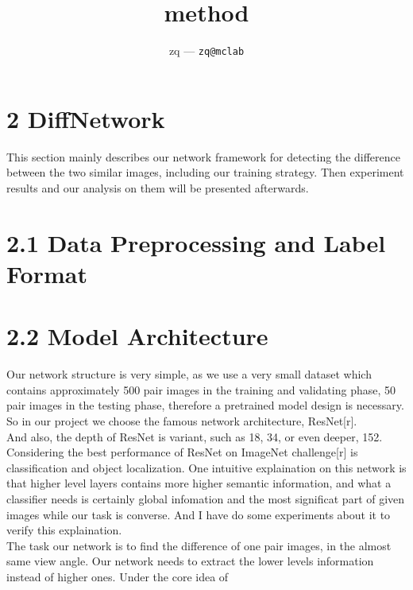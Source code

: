 \documentclass[12pt]{article}
\title{
	method
}
\author{
	zq --- \texttt{zq@mclab}
}
\begin{document}
\maketitle

\section{2 DiffNetwork}

This section mainly describes our network framework for detecting the difference between the two similar images, including our training strategy. Then experiment results and our analysis on them will be presented afterwards.\\

\section{2.1 Data Preprocessing and Label Format}


\section{2.2 Model Architecture}

Our network structure is very simple, as we use a very small dataset which contains approximately 500 pair images in the training and validating phase,  50 pair images in the testing phase, therefore a pretrained model design is necessary. So in our project we choose the famous network architecture, ResNet[r].\\

And also, the depth of ResNet is variant, such as 18, 34, or even deeper, 152. Considering the best performance of ResNet on ImageNet challenge[r] is classification and object localization. One intuitive explaination on this network is that higher level layers contains more higher semantic information, and what a classifier needs is certainly global infomation and the most significat part of given images while our task is converse. And I have do some experiments about it to verify this explaination.\\

The task our network is to find the difference of one pair images, in the almost same view angle. Our network needs to extract the lower levels information instead of higher ones. Under the core idea of 
\end{document}
